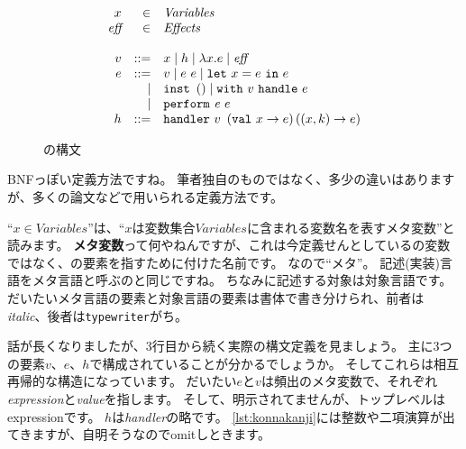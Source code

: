 \documentclass{ltjsarticle}
\begin{document}
\begin{figure}[ht]
  \begin{tcolorbox}
    \[
      \begin{array}{rrl}
        x & \in & \variable{Variables}\\
        \variable{eff} & \in & \variable{Effects}\\
                       &&\\
        v & ::= & x \mid h \mid \lambda x. e \mid \variable{eff}\\
        e & ::= & v \mid e\ e \mid \letT{x}{e}{e}\\
          &\mid & \instT \mid \withhandle{v\ }{e} \\
          &\mid & \perform{\variable{e\ }{e}}\\
        h & ::= & \handlerK v\ \left(\keyword{val} x \rightarrow e\right) \left(\left(x, k\right)\rightarrow e\right)\\
      \end{array}
    \]
  \end{tcolorbox}

  \caption{\lambdaeff{}の構文}
  \label{fig:lambdaeff}
\end{figure}

BNFっぽい定義方法ですね。
筆者独自のものではなく、多少の違いはありますが、多くの論文などで用いられる定義方法です。

``$x \in \mathit{Variables}$''は、``$x$は変数集合$\mathit{Variables}$に含まれる変数名を表すメタ変数''と読みます。
\textbf{メタ変数}って何やねんですが、これは今定義せんとしている\lambdaeff{}の変数ではなく、\lambdaeff{}の要素を指すために付けた名前です。
なので``メタ''。
記述(実装)言語をメタ言語と呼ぶのと同じですね。
ちなみに記述する対象は対象言語です。
だいたいメタ言語の要素と対象言語の要素は書体で書き分けられ、前者は\textit{italic}、後者は\texttt{typewriter}がち。

話が長くなりましたが、3行目から続く実際の構文定義を見ましょう。
主に3つの要素$v$、$e$、$h$で構成されていることが分かるでしょうか。
そしてこれらは相互再帰的な構造になっています。
だいたい$e$と$v$は頻出のメタ変数で、それぞれ\textit{expression}と\textit{value}を指します。
そして、明示されてませんが、トップレベルはexpressionです。
$h$は\textit{handler}の略です。
\autoref{lst:konnakanji}には整数や二項演算が出てきますが、自明そうなのでomitしときます。
\end{document}
